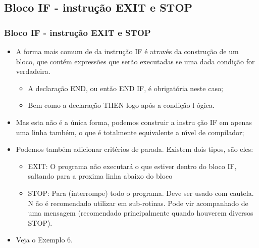 \documentclass[xcolor=table]{beamer}
\newenvironment{stepitemize}{\begin{itemize}[<+->]}{\end{itemize} }
\begin{document}
\subsection{Bloco IF - instru\c{c}\~{a}o EXIT e STOP}
\begin{frame}%

\frametitle{Bloco IF - instru\c{c}\~{a}o EXIT e STOP}

\begin{stepitemize}
\item A forma mais comum de da instru\c{c}\~{a}o IF \'{e} atrav\'{e}s da
constru\c{c}\~{a}o de um bloco, que cont\'{e}m express\~{o}es que ser\~{a}o
executadas se uma dada condi\c{c}\~{a}o for verdadeira.

\begin{itemize}
\item A declara\c{c}\~{a}o END, ou ent\~{a}o END IF, \'{e} obrigat\'{o}ria
neste caso;

\item Bem como a declara\c{c}\~{a}o THEN logo ap\'{o}s a condi\c{c}\~{a}o l%
\'{o}gica.
\end{itemize}

\item Mas esta n\~{a}o \'{e} a \'{u}nica forma, podemos construir a instru%
\c{c}\~{a}o IF em apenas uma linha tamb\'{e}m, o que \'{e} totalmente
equivalente a n\'{\i}vel de compilador;

\item Podemos tamb\'{e}m adicionar crit\'{e}rios de parada. Existem dois
tipos, s\~{a}o eles:

\begin{itemize}
\item EXIT: O programa n\~{a}o executar\'{a} o que estiver dentro do bloco
IF, saltando para a proxima linha abaixo do bloco

\item STOP: Para (interrompe) todo o programa. Deve ser usado com cautela. N%
\~{a}o \'{e} recomendado utilizar em sub-rotinas. Pode vir acompanhado de
uma mensagem (recomendado principalmente quando houverem diversos STOP).
\end{itemize}

\item Veja o Exemplo 6.
\end{stepitemize}

\transboxout%
\end{frame}%
\end{document}
